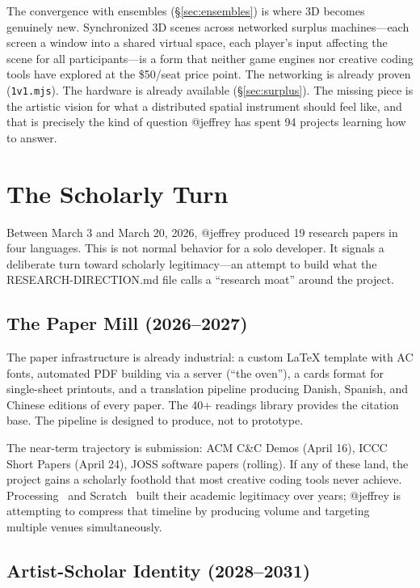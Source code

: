\documentclass[10pt,letterpaper,twocolumn]{article}
\begin{document}
The convergence with ensembles (\S\ref{sec:ensembles}) is where 3D becomes genuinely new. Synchronized 3D scenes across networked surplus machines---each screen a window into a shared virtual space, each player's input affecting the scene for all participants---is a form that neither game engines nor creative coding tools have explored at the \$50/seat price point. The networking is already proven (\texttt{1v1.mjs}). The hardware is already available (\S\ref{sec:surplus}). The missing piece is the artistic vision for what a distributed spatial instrument should feel like, and that is precisely the kind of question @jeffrey has spent 94 projects learning how to answer.


\section{The Scholarly Turn}
\label{sec:scholarly}

Between March 3 and March 20, 2026, @jeffrey produced 19 research papers in four languages. This is not normal behavior for a solo developer. It signals a deliberate turn toward scholarly legitimacy---an attempt to build what the RESEARCH-DIRECTION.md file calls a ``research moat'' around the project.

\subsection{The Paper Mill (2026--2027)}

The paper infrastructure is already industrial: a custom \LaTeX{} template with AC fonts, automated PDF building via a server (``the oven''), a cards format for single-sheet printouts, and a translation pipeline producing Danish, Spanish, and Chinese editions of every paper. The 40+ readings library provides the citation base. The pipeline is designed to produce, not to prototype.

The near-term trajectory is submission: ACM C\&C Demos (April 16), ICCC Short Papers (April 24), JOSS software papers (rolling). If any of these land, the project gains a scholarly foothold that most creative coding tools never achieve. Processing~\citep{reas2007processing} and Scratch~\citep{resnick2009scratch} built their academic legitimacy over years; @jeffrey is attempting to compress that timeline by producing volume and targeting multiple venues simultaneously.

\subsection{Artist-Scholar Identity (2028--2031)}
\end{document}
